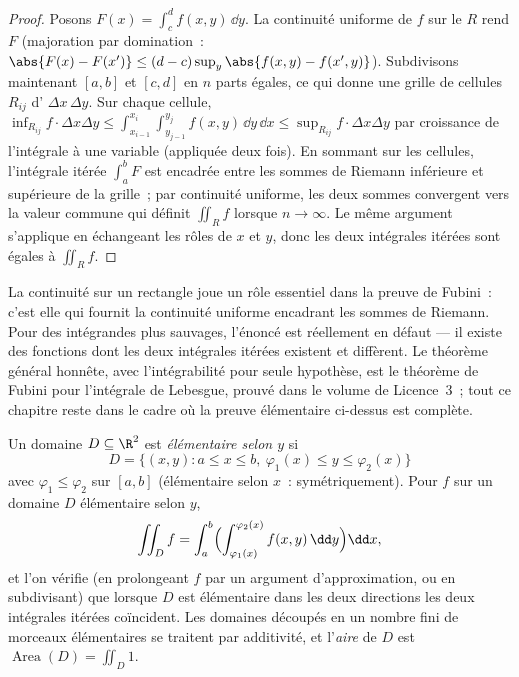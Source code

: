 \begin{proof}
Posons $F(x) = \int_c^d f(x, y)\,\dd y$. La continuité uniforme de $f$
sur le  $R$ rend $F$  (majoration par domination~:
$\abs{F(x) - F(x')} \leq (d - c)\sup_y\abs{f(x,y) - f(x',y)}$).
Subdivisons maintenant $[a,b]$ et $[c,d]$ en $n$ parts égales, ce qui
donne une grille de cellules $R_{ij}$ d' $\Delta x\,\Delta y$. Sur
chaque cellule,
$\inf_{R_{ij}} f \cdot \Delta x \Delta y \leq
\int_{x_{i-1}}^{x_i}\int_{y_{j-1}}^{y_j} f(x,y)\,\dd y\,\dd x \leq
\sup_{R_{ij}} f \cdot \Delta x \Delta y$ par croissance de l'intégrale
à une variable (appliquée deux fois). En sommant sur les cellules,
l'intégrale itérée $\int_a^b F$ est encadrée entre les sommes de
Riemann inférieure et supérieure de la grille~; par continuité
uniforme, les deux sommes convergent vers la valeur commune qui
définit $\iint_R f$ lorsque $n \to
\infty$. Le même argument s'applique en échangeant les rôles de $x$
et $y$, donc les deux intégrales itérées sont égales à $\iint_R f$.
\end{proof}

\begin{remark}
La continuité sur un rectangle  joue un rôle essentiel dans
la preuve de Fubini~: c'est elle qui fournit la continuité uniforme
encadrant les sommes de Riemann. Pour des intégrandes plus
sauvages, l'énoncé est réellement en défaut --- il existe des
fonctions dont les deux intégrales itérées existent et diffèrent. Le
théorème général honnête, avec l'intégrabilité pour seule hypothèse,
est le théorème de Fubini pour l'intégrale de Lebesgue, prouvé dans le
volume de Licence~3~; tout ce chapitre reste dans le cadre  où
la preuve élémentaire ci-dessus est complète.
\end{remark}

\begin{definition}\label{def:b2:multint:domain}
Un domaine $D \subseteq \R^2$ est \emph{élémentaire selon $y$} si
\[
D = \{(x, y) : a \leq x \leq b,\
\varphi_1(x) \leq y \leq \varphi_2(x)\}
\]
avec $\varphi_1 \leq \varphi_2$  sur $[a,b]$
(élémentaire selon $x$~: symétriquement). Pour $f$  sur un
domaine $D$ élémentaire selon $y$,
\[
\iint_D f
= \int_a^b\Bigl(
\int_{\varphi_1(x)}^{\varphi_2(x)} f(x,y)\,\dd y\Bigr)\dd x ,
\]
et l'on vérifie (en prolongeant $f$ par un argument d'approximation, ou
en subdivisant) que lorsque $D$ est élémentaire dans les deux
directions les deux intégrales itérées coïncident. Les domaines
découpés en un nombre fini de morceaux élémentaires se traitent par
additivité, et l'\emph{aire}\index{aire!d'un domaine plan} de $D$ est $\operatorname
{Area}(D) = \iint_D 1$.
\end{definition}

